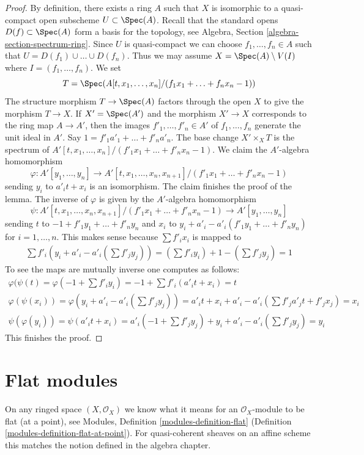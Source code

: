 \begin{proof}
By definition, there exists a ring $A$ such that $X$ is isomorphic to a
quasi-compact open subscheme $U \subset \Spec(A)$. Recall that the standard
opens $D(f) \subset \Spec(A)$ form a basis for the topology, see
Algebra, Section \ref{algebra-section-spectrum-ring}. Since $U$ is
quasi-compact we can choose $f_1, \ldots, f_n \in A$ such that
$U = D(f_1) \cup \ldots \cup D(f_n)$. Thus we may assume
$X = \Spec(A) \setminus V(I)$ where $I = (f_1, \ldots, f_n)$. We set
$$
T = \Spec(A[t, x_1, \ldots, x_n]/(f_1 x_1 + \ldots + f_n x_n - 1))
$$
The structure morphism $T \to \Spec(A)$ factors through the open $X$
to give the morphism $T \to X$. If $X' = \Spec(A')$ and the morphism
$X' \to X$ corresponds to the ring map $A \to A'$, then the images
$f'_1, \ldots, f'_n \in A'$ of $f_1, \ldots, f_n$
generate the unit ideal in $A'$.
Say $1 = f'_1 a'_1 + \ldots + f'_n a'_n$.
The base change $X' \times_X T$ is the spectrum of
$A'[t, x_1, \ldots, x_n]/(f'_1 x_1 + \ldots + f'_n x_n - 1)$.
We claim the $A'$-algebra homomorphism
$$
\varphi :
A'[y_1, \ldots, y_n]
\longrightarrow
A'[t, x_1, \ldots, x_n, x_{n + 1}]/(f'_1 x_1 + \ldots + f'_n x_n - 1)
$$
sending $y_i$ to $a'_i t + x_i$ is an isomorphism. The claim finishes
the proof of the lemma. The inverse of $\varphi$ is given by the $A'$-algebra
homomorphism
$$
\psi :
A'[t, x_1, \ldots, x_n, x_{n + 1}]/(f'_1 x_1 + \ldots + f'_n x_n - 1)
\longrightarrow
A'[y_1, \ldots, y_n]
$$
sending $t$ to $-1 + f'_1 y_1 + \ldots + f'_n y_n$ and $x_i$ to
$y_i + a'_i - a'_i(f'_1 y_1 + \ldots + f'_n y_n)$ for $i = 1, \ldots, n$.
This makes sense because $\sum f'_ix_i$ is mapped to
$$
\begin{matrix}
\sum f'_i(y_i + a'_i - a'_i(\sum f'_j y_j)) =
(\sum f'_iy_i) + 1 - (\sum f'_j y_j) = 1
\end{matrix}
$$
To see the maps are mutually inverse one computes as follows:
$$
\begin{matrix}
\varphi(\psi(t) = \varphi(-1 +  \sum f'_i y_i) =
-1 + \sum f'_i (a'_i t + x_i) = t \\
\varphi(\psi(x_i)) = \varphi(y_i + a'_i - a'_i(\sum f'_j y_j)) =
a'_i t + x_i + a'_i - a'_i(\sum f'_ja'_jt + f'_jx_j) = x_i \\
\psi(\varphi(y_i)) = \psi(a'_i t + x_i) =
a'_i(-1 + \sum f'_j y_j) + y_i + a'_i - a'_i(\sum f'_j y_j) = y_i
\end{matrix}
$$
This finishes the proof.
\end{proof}

\section{Flat modules}
\label{properties-section-flat}
On any ringed space $(X, \mathcal{O}_X)$
we know what it means for an $\mathcal{O}_X$-module
to be flat (at a point), see
Modules, Definition \ref{modules-definition-flat}
(Definition \ref{modules-definition-flat-at-point}).
For quasi-coherent sheaves on an affine scheme this matches the notion
defined in the algebra chapter.

